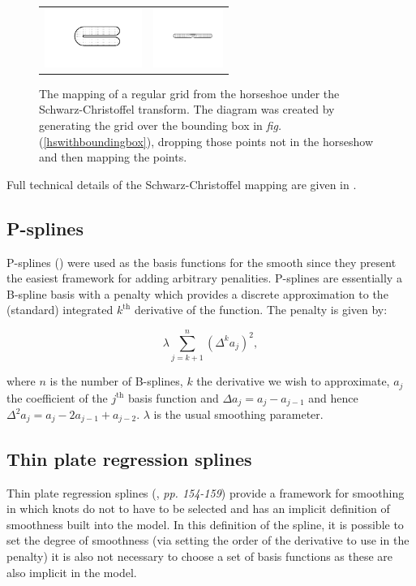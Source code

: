 \documentclass[a4paper,10pt]{amsart}
\newcommand{\sch}{Schwarz-Christoffel }
\newcommand{\fig}[1]{\emph{fig.} (\ref{#1})}
\begin{document}
\begin{figure}
\centering
\begin{tabular}{cc}
\includegraphics[height=0.75in, trim=1in 1in 0in 0.75in]{figs/hsgridmapping-1} & \includegraphics[height=0.75in, trim=1in 1in 0in 0.75in]{figs/hsgridmapping-2} \\
\end{tabular}
\caption{The mapping of a regular grid from the horseshoe under the \sch transform. The diagram was created by generating the grid over the bounding box in \fig{hswithboundingbox}, dropping those points not in the horseshow and then mapping the points.}
\label{hsgridmapping}
\end{figure}

Full technical details of the \sch mapping are given in \cite{miller08}.


\subsection{P-splines}
P-splines (\cite{eilersmarx96}) were used as the basis functions for the smooth since they present the easiest framework for adding arbitrary penalities. P-splines are essentially a B-spline basis with a penalty which provides a discrete approximation to the (standard) integrated $k^\text{th}$ derivative of the function. The penalty is given by:

\begin{equation*}
\lambda \sum_{j=k+1}^n (\Delta^k a_j)^2,
\end{equation*}

where $n$ is the number of B-splines, $k$ the derivative we wish to approximate, $a_j$ the coefficient of the $j^\text{th}$ basis function and $\Delta a_j = a_j-a_{j-1}$ and hence $\Delta^2 a_j = a_j-2a_{j-1}+a_{j-2}$. $\lambda$ is the usual smoothing parameter. 

\subsection{Thin plate regression splines}
Thin plate regression splines (\cite{simonbook}, \emph{pp. 154-159}) provide a framework for smoothing in which knots do not to have to be selected and has an implicit definition of smoothness built into the model. In this definition of the spline, it is possible to set the degree of smoothness (via setting the order of the derivative to use in the penalty) it is also not necessary to choose a set of basis functions as these are also implicit in the model. 
\end{document}
